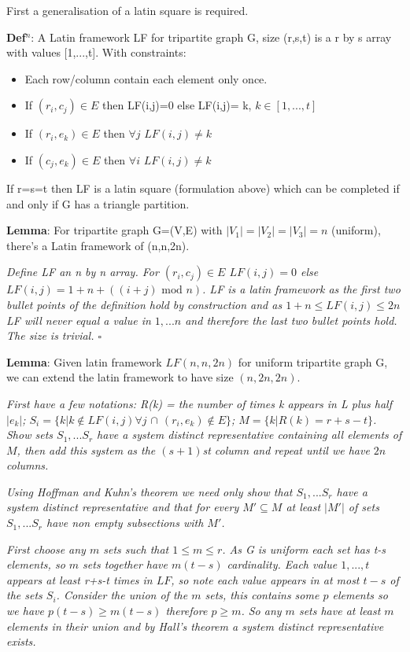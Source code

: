 \documentclass[a4paper,11pt]{report}
\newcounter{row}
\newcounter{col}
\begin{document}
First a generalisation of a latin square is required.

\textbf{Def$^n$}: A Latin framework LF for tripartite graph G, size (r,s,t) is a r by s array with values [1,...,t]. With constraints:
\begin{itemize}
\item{Each row/column contain each element only once.}
\item{If $(r_i,c_j)\in E$ then LF(i,j)=0 else LF(i,j)= k, $k\in [1,...,t]$}
\item{If $(r_i,e_k)\in E$  then $\forall j$ $LF(i,j)\neq k$}
\item{If $(c_j,e_k)\in E$  then $\forall i$ $LF(i,j)\neq k$}
\end{itemize}
If r=s=t then LF is a latin square (formulation above) which can be completed if and only if G has a triangle partition.

\textbf{Lemma}: For tripartite graph G=(V,E) with $|V_1|=|V_2|=|V_3|=n$ (uniform), there's a Latin framework of (n,n,2n).

\textit{Define LF an n by n array. For $(r_i,c_j)\in E$ $LF(i,j)=0$ else $LF(i,j)=1+n+((i+j)\text{ mod }n)$. LF is a latin framework as the first two bullet points of the definition hold by construction and as $1+n\leq LF(i,j)\leq 2n$ LF will never equal a value in $1,...n$ and therefore the last two bullet points hold. The size is trivial. $\square$}

\textbf{Lemma}: Given latin framework $LF(n,n,2n)$ for uniform tripartite graph G, we can extend the latin framework to have size $(n,2n,2n)$.

\textit{First have a few notations: R(k) = the number of times k appears in L plus half $|e_k|$; $S_i=\{k|k \not\in LF(i,j)\forall j$ $ \cap$ $ (r_i,e_k)\not\in E\}$; $M=\{k|R(k)=r+s-t\}$. Show sets $S_1,...S_r$ have a system distinct representative  containing all elements of $M$, then add this system as the $(s+1)$st column and repeat until we have $2n$ columns.}

\textit{Using Hoffman and Kuhn's theorem \cite{hoffman} we need only show that $S_1,...S_r$ have a system distinct representative and that for every $M'\subseteq M$ at least $|M'|$ of sets $S_1,...S_r$ have non empty subsections with $M'$.}

\textit{First choose any $m$ sets such that $1\leq m \leq r$. As G is uniform each set has t-s elements, so $m$ sets together have $m(t-s)$ cardinality. Each value $1,...,t$ appears at least r+s-t times in $LF$, so note each value appears in at most $t-s$ of the sets $S_i$. Consider the union of the $m$ sets, this contains some $p$ elements so we have $p(t-s)\geq m(t-s)$ therefore $p\geq m$. So any $m$ sets have at least $m$ elements in their union and by Hall's theorem \cite{hall} a system distinct representative exists.}
\end{document}
